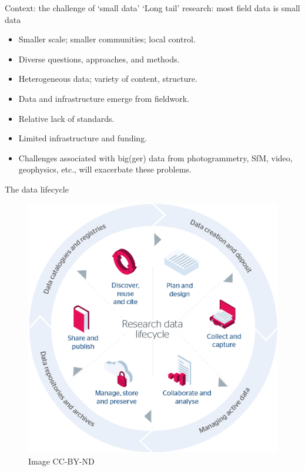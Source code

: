 \documentclass[aspectratio=169, 12pt]{beamer} %
\begin{document}
\begin{frame}{Context: the challenge of `small data'}
    `Long tail' research: most field data is small data \cite{Borgman2015-rh}
    \begin{itemize}[label=\textbullet]
        \item Smaller scale; smaller communities; local control.
        \item Diverse questions, approaches, and methods.
        \item Heterogeneous data; variety of content, structure.
        \item Data and infrastructure emerge from fieldwork. 
        \item Relative lack of standards.
        \item Limited infrastructure and funding.
        \item Challenges associated with big(ger) data from photogrammetry, SfM, video, geophysics, etc., will exacerbate these problems.
    \end{itemize}
\end{frame}

\begin{frame}{The data lifecycle}
 \begin{figure}[H]
    \centering
        \includegraphics[height=.75\textheight]{figures/research-data-life-diagram.png}
        \caption{\cite{Jisc2018-gx} Image CC-BY-ND}
        \label{fig:figure9}
 \end{figure}
\end{frame}
\end{document}

